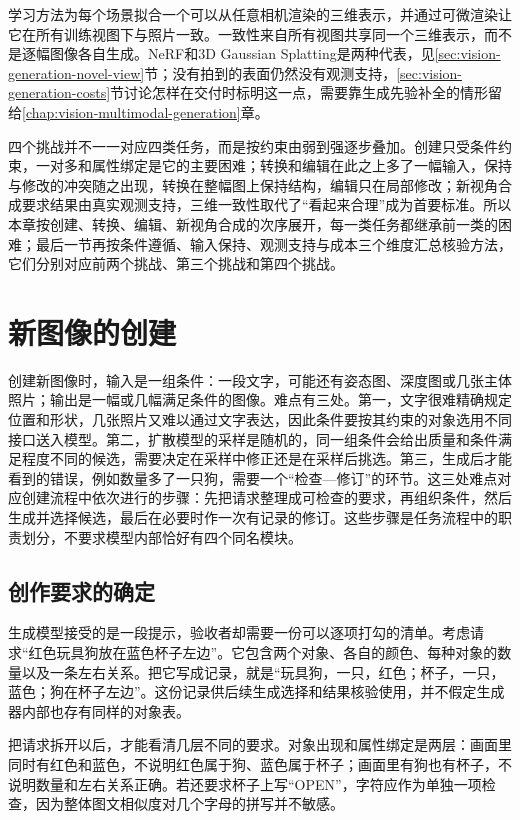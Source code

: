 学习方法为每个场景拟合一个可以从任意相机渲染的三维表示，并通过可微渲染让它在所有训练视图下与照片一致。一致性来自所有视图共享同一个三维表示，而不是逐幅图像各自生成。NeRF和3D Gaussian Splatting是两种代表，见\ref{sec:vision-generation-novel-view}节；没有拍到的表面仍然没有观测支持，\ref{sec:vision-generation-costs}节讨论怎样在交付时标明这一点，需要靠生成先验补全的情形留给\ref{chap:vision-multimodal-generation}章。

四个挑战并不一一对应四类任务，而是按约束由弱到强逐步叠加。创建只受条件约束，一对多和属性绑定是它的主要困难；转换和编辑在此之上多了一幅输入，保持与修改的冲突随之出现，转换在整幅图上保持结构，编辑只在局部修改；新视角合成要求结果由真实观测支持，三维一致性取代了“看起来合理”成为首要标准。所以本章按创建、转换、编辑、新视角合成的次序展开，每一类任务都继承前一类的困难；最后一节再按条件遵循、输入保持、观测支持与成本三个维度汇总核验方法，它们分别对应前两个挑战、第三个挑战和第四个挑战。

\section{新图像的创建}
\label{sec:vision-generation-creation}

创建新图像时，输入是一组条件：一段文字，可能还有姿态图、深度图或几张主体照片；输出是一幅或几幅满足条件的图像。难点有三处。第一，文字很难精确规定位置和形状，几张照片又难以通过文字表达，因此条件要按其约束的对象选用不同接口送入模型。第二，扩散模型的采样是随机的，同一组条件会给出质量和条件满足程度不同的候选，需要决定在采样中修正还是在采样后挑选。第三，生成后才能看到的错误，例如数量多了一只狗，需要一个“检查—修订”的环节。这三处难点对应创建流程中依次进行的步骤：先把请求整理成可检查的要求，再组织条件，然后生成并选择候选，最后在必要时作一次有记录的修订。这些步骤是任务流程中的职责划分，不要求模型内部恰好有四个同名模块。

\subsection{创作要求的确定}
\label{sec:vision-generation-requirements}

生成模型接受的是一段提示，验收者却需要一份可以逐项打勾的清单。考虑请求“红色玩具狗放在蓝色杯子左边”。它包含两个对象、各自的颜色、每种对象的数量以及一条左右关系。把它写成记录，就是“玩具狗，一只，红色；杯子，一只，蓝色；狗在杯子左边”。这份记录供后续生成选择和结果核验使用，并不假定生成器内部也存有同样的对象表。

把请求拆开以后，才能看清几层不同的要求。对象出现和属性绑定是两层：画面里同时有红色和蓝色，不说明红色属于狗、蓝色属于杯子；画面里有狗也有杯子，不说明数量和左右关系正确。若还要求杯子上写“OPEN”，字符应作为单独一项检查，因为整体图文相似度对几个字母的拼写并不敏感。

